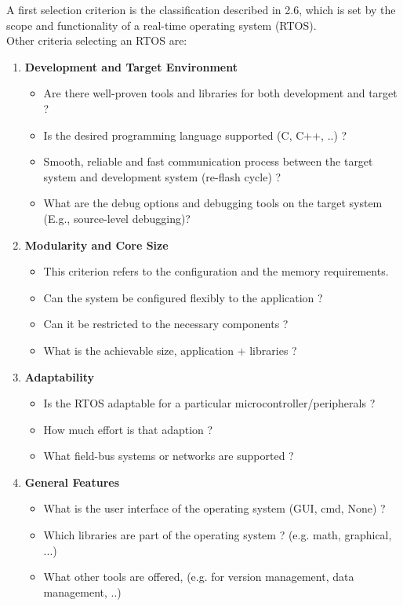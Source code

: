 A first selection criterion is the classification described in 2.6, which is set by the scope and functionality of a real-time operating system (RTOS).\\

Other criteria selecting an RTOS are:

\begin{enumerate}
\item  \textbf{Development and Target Environment}

\begin{itemize}
	\item  Are there well-proven tools and libraries for both development and target ?
	\item Is the desired programming language supported (C, C++, ..) ?
	\item Smooth, reliable and fast communication process between the  target system and development system (re-flash cycle) ?
	\item What are the debug options and debugging tools on the target system  (E.g., source-level debugging)?
\end{itemize}

\item  \textbf{Modularity and Core Size}

\begin{itemize}
	\item  This criterion refers to the configuration and the memory requirements.
	\item Can the system be configured flexibly to the application ?
	\item Can it be restricted to the necessary components ? 
	\item What is the achievable size, application + libraries ?
\end{itemize}

\item  \textbf{Adaptability}

\begin{itemize}
	\item Is the RTOS adaptable for a particular microcontroller/peripherals ?
	\item How much effort is that adaption ?
	\item What field-bus systems or networks are supported ?
\end{itemize}

\item  \textbf{General Features}

\begin{itemize}
	\item What is the user interface of the operating system (GUI, cmd, None) ?
	\item Which libraries are part of the operating system ? (e.g. math, graphical, ...)
	\item What other tools are offered, (e.g. for version management, data management, ..)
\end{itemize}


\end{enumerate}
